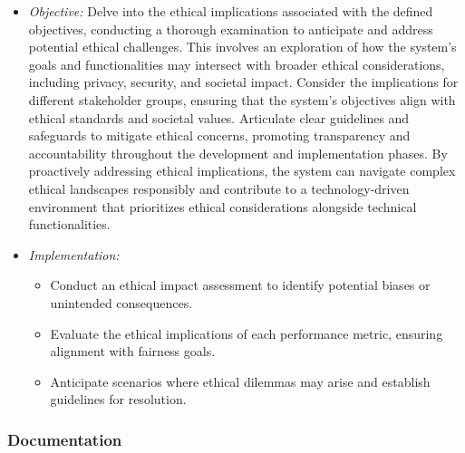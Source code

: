 \documentclass[12pt,a4paper,openright,twoside]{book}
\begin{document}
\begin{itemize}

    \item \emph{Objective:} Delve into the ethical implications associated with the defined objectives, conducting a thorough examination to anticipate and address potential ethical challenges. This involves an exploration of how the system's goals and functionalities may intersect with broader ethical considerations, including privacy, security, and societal impact. Consider the implications for different stakeholder groups, ensuring that the system's objectives align with ethical standards and societal values. Articulate clear guidelines and safeguards to mitigate ethical concerns, promoting transparency and accountability throughout the development and implementation phases. By proactively addressing ethical implications, the system can navigate complex ethical landscapes responsibly and contribute to a technology-driven environment that prioritizes ethical considerations alongside technical functionalities.

    \item \emph{Implementation:}

        \begin{itemize}

            \item Conduct an ethical impact assessment to identify potential biases or unintended consequences.

            \item Evaluate the ethical implications of each performance metric, ensuring alignment with fairness goals.

            \item Anticipate scenarios where ethical dilemmas may arise and establish guidelines for resolution.

        \end{itemize}

\end{itemize}

\subsubsection{Documentation}
\end{document}
